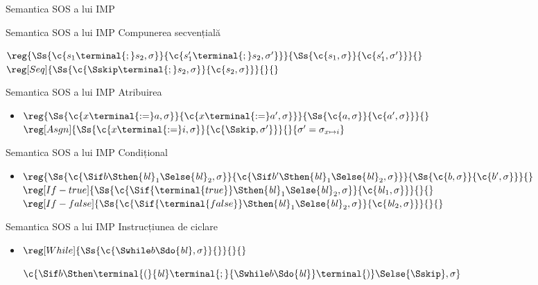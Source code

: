 \documentclass[xcolor=pdftex,romanian,colorlinks]{beamer}
\begin{document}
\begin{section}{Semantica SOS a lui IMP}
  \begin{frame}{Semantica SOS a lui IMP}
  {Compunerea secvențială}
  \begin{itemize}
  \vitem[] $\reg{\Ss{\c{s_1 \terminal{;} s_2,\sigma}}{\c{s_1' \terminal{;} s_2,\sigma'}}}{\Ss{\c{s_1,\sigma}}{\c{s_1',\sigma'}}}{}$
  \vitem[] $\reg[Seq]{\Ss{\c{\Sskip \terminal{;} s_2,\sigma}}{\c{s_2,\sigma}}}{}{}$
  \end{itemize}
  \end{frame}

  \begin{frame}{Semantica SOS a lui IMP}
  {Atribuirea}
  \begin{itemize}
  \item[] $\reg{\Ss{\c{x \terminal{:=} a ,\sigma}}{\c{x \terminal{:=} a' ,\sigma}}}{\Ss{\c{a,\sigma}}{\c{a',\sigma}}}{}$
  \vitem[] $\reg[Asgn]{\Ss{\c{x \terminal{:=} i ,\sigma}}{\c{\Sskip,\sigma'}}}{}{\sigma'=\sigma_{x \mapsto i}}$
  \end{itemize}
  \end{frame}

  \begin{frame}{Semantica SOS a lui IMP}
  {Condițional}
  \begin{itemize}
  \item[]
  $\reg{
   \Ss{\c{\Sif b \Sthen {\it bl}_1 \Selse {\it bl}_2,\sigma}}{\c{\Sif b' \Sthen {\it bl}_1 \Selse {\it bl}_2,\sigma}}
  }{
    \Ss{\c{b,\sigma}}{\c{b',\sigma}}
  }
  {}$
  \vitem[]
  $\reg[If-true]{\Ss{\c{\Sif {\terminal{true}} \Sthen {\it bl}_1 \Selse {\it bl}_2,\sigma}}{\c{{\it bl}_1,\sigma}}}{}{}$
  \vitem[]
  $\reg[If-false]{\Ss{\c{\Sif {\terminal{false}} \Sthen {\it bl}_1 \Selse {\it bl}_2,\sigma}}{\c{{\it bl}_2,\sigma}}}{}{}$

  \end{itemize}
  \end{frame}

  \begin{frame}{Semantica SOS a lui IMP}
  {Instrucțiunea de ciclare}
  \begin{itemize}
  \item[]
  $\reg[While]{
   \Ss{\c{\Swhile b \Sdo {\it bl},\sigma}}{}}{}{}
  $

  \hfill $\c{\Sif b\Sthen \terminal{(} {\it bl}\terminal{;} {\Swhile b\Sdo {\it bl}} \terminal{)} \Selse {\Sskip},\sigma}$
  \end{itemize}
  \end{frame}



\end{section}
\end{document}
